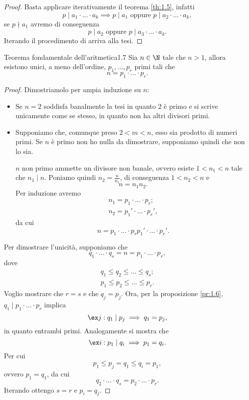 \begin{proof}
	Basta applicare iterativamente il teorema \ref{th:1.5}, infatti
	\[
		p\mid a_1\cdot\ldots\cdot a_k\implies p\mid a_1\text{ oppure }p\mid a_2\cdot\ldots\cdot a_k,
	\]
	se \(p\nmid a_1\) avremo di conseguenza
	\[
		p\mid a_2\text{ oppure }p\mid a_3\cdot\ldots\cdot a_k.
	\]
	Iterando il procedimento di arriva alla tesi.
\end{proof}

\begin{teor}{Teorema fondamentale dell'aritmetica}{1.7}
	Sia \(n\in\N\) tale che \(n>1\), allora esistono unici, a meno dell'ordine, \(p_1,\dots,p_r\) primi tali che
	\[
		n=p_1\cdot\ldots\cdot p_r.
	\]
\end{teor}

\begin{proof}
	Dimostriamolo per ampia induzione su \(n\):
	\begin{itemize}
		\item Se \(n=2\) soddisfa banalmente la tesi in quanto \(2\) è primo e si scrive unicamente come se stesso, in quanto non ha altri divisori primi.
		\item Supponiamo che, comunque preso \(2<m<n\), esso sia prodotto di numeri primi.
		      Se \(n\) è primo non ho nulla da dimostrare, supponiamo quindi che non lo sia.

		      \(n\) non primo ammette un divisore non banale, ovvero esiste \(1<n_1<n\) tale che \(n_1\mid n\).
		      Poniamo quindi \(n_2=\frac{n}{n_1}\), di conseguenza \(1<n_2<n\) e
		      \[
			      n=n_1 n_2.
		      \]
		      Per induzione avremo
		      \begin{gather*}
			      n_1=p_1\cdot\ldots\cdot p_r;\\
			      n_2=p_1'\cdot\ldots\cdot p_r',
		      \end{gather*}
		      da cui
		      \[
			      n=p_1\cdot\ldots\cdot p_r p_1'\cdot\ldots\cdot p_r'.
		      \]
	\end{itemize}
	Per dimostrare l'unicità, supponiamo che
	\[
		q_1\cdot\ldots\cdot q_s=n=p_1\cdot\ldots\cdot p_r,
	\]
	dove
	\begin{gather*}
		q_1\le q_2\le\dots\le q_s;\\
		p_1\le p_2\le\dots\le p_r.
	\end{gather*}
	Voglio mostrare che \(r=s\) e che \(q_j=p_j\).
	Ora, per la proposizione \ref{pr:1.6}, \(q_1\mid p_1\cdot\ldots\cdot p_r\) implica
	\[
		\ex j:q_1\mid p_j\implies q_1=p_j,
	\]
	in quanto entrambi primi.
	Analogamente si mostra che
	\[
		\ex i:p_1\mid q_i\implies p_1=q_i.
	\]
	Per cui
	\[
		p_1\le p_j=q_1\le q_i=p_1,
	\]
	ovvero \(p_1=q_1\), da cui
	\[
		q_2\cdot\ldots\cdot q_s=p_2\cdot\ldots\cdot p_r.
	\]
	Iterando ottengo \(s=r\) e \(p_i=q_j\).
\end{proof}

